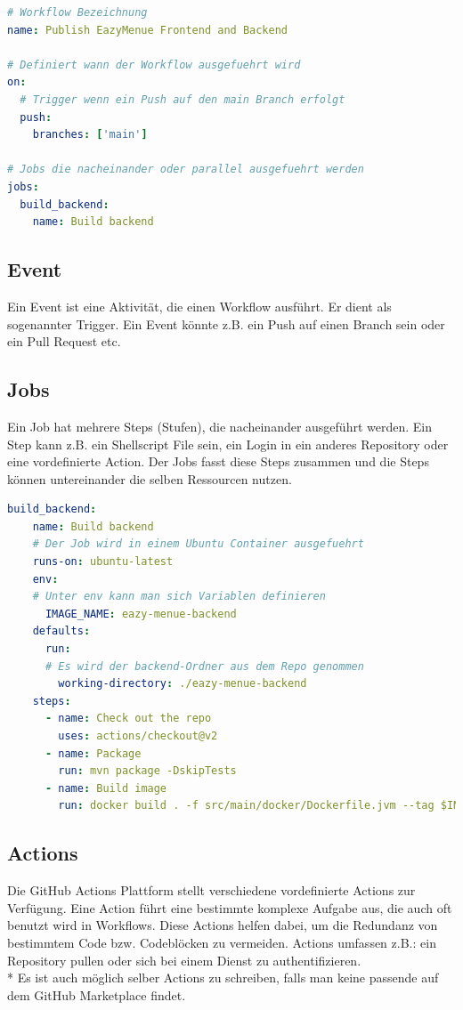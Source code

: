 \begin{lstlisting}[language=yaml,caption=Ausschnitt eines Workflow Files]
# Workflow Bezeichnung
name: Publish EazyMenue Frontend and Backend

# Definiert wann der Workflow ausgefuehrt wird 
on:
  # Trigger wenn ein Push auf den main Branch erfolgt
  push:
    branches: ['main']

# Jobs die nacheinander oder parallel ausgefuehrt werden
jobs:
  build_backend:
    name: Build backend
\end{lstlisting}

\subsection{Event}
Ein Event ist eine Aktivität, die einen Workflow ausführt. Er dient als sogenannter Trigger.
Ein Event könnte z.B. ein Push auf einen Branch sein oder ein Pull Request etc.\cite{GHAction}

\subsection{Jobs}
Ein Job hat mehrere Steps (Stufen), die nacheinander ausgeführt werden. Ein Step kann z.B. ein Shellscript File sein, ein
Login in ein anderes Repository oder eine vordefinierte Action. Der Jobs fasst diese Steps zusammen und die Steps können untereinander die selben Ressourcen nutzen.\cite{GHAction}

\begin{lstlisting}[language=yaml,caption=Ausschnitt eines Jobs]
    build_backend:
    name: Build backend
    # Der Job wird in einem Ubuntu Container ausgefuehrt
    runs-on: ubuntu-latest
    env:
    # Unter env kann man sich Variablen definieren
      IMAGE_NAME: eazy-menue-backend
    defaults:
      run:
      # Es wird der backend-Ordner aus dem Repo genommen
        working-directory: ./eazy-menue-backend
    steps:
      - name: Check out the repo
        uses: actions/checkout@v2
      - name: Package
        run: mvn package -DskipTests
      - name: Build image
        run: docker build . -f src/main/docker/Dockerfile.jvm --tag $IMAGE_NAME
\end{lstlisting}

\subsection{Actions}
Die GitHub Actions Plattform stellt verschiedene vordefinierte Actions zur Verfügung.
Eine Action führt eine bestimmte komplexe Aufgabe aus, die auch oft benutzt wird in Workflows. Diese Actions helfen dabei,
um die Redundanz von bestimmtem Code bzw. Codeblöcken zu vermeiden.
Actions umfassen z.B.: ein Repository pullen oder sich bei einem Dienst zu authentifizieren.\\*
Es ist auch möglich selber Actions zu schreiben, falls man keine passende auf dem GitHub Marketplace findet.\cite{GHAction}


